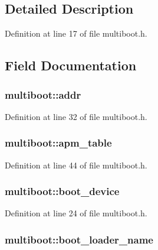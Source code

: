 \subsection{Detailed Description}


Definition at line 17 of file multiboot.h.



\subsection{Field Documentation}
\hypertarget{structmultiboot_a431baceb33f4cc5b3d503d8b8a6f007e}{
\subsubsection[{addr}]{ {\bf multiboot::addr}}}
\label{structmultiboot_a431baceb33f4cc5b3d503d8b8a6f007e}


Definition at line 32 of file multiboot.h.

\hypertarget{structmultiboot_a863760d4ec3dd65fc28eafa28e9017e6}{
\subsubsection[{apm\_\-table}]{ {\bf multiboot::apm\_\-table}}}
\label{structmultiboot_a863760d4ec3dd65fc28eafa28e9017e6}


Definition at line 44 of file multiboot.h.

\hypertarget{structmultiboot_a834a8b0e2158664622992058f9ef49bd}{
\subsubsection[{boot\_\-device}]{ {\bf multiboot::boot\_\-device}}}
\label{structmultiboot_a834a8b0e2158664622992058f9ef49bd}


Definition at line 24 of file multiboot.h.

\hypertarget{structmultiboot_a2b1df7d97141ecbc3b3d5635f77d35da}{
\subsubsection[{boot\_\-loader\_\-name}]{ {\bf multiboot::boot\_\-loader\_\-name}}}
\label{structmultiboot_a2b1df7d97141ecbc3b3d5635f77d35da}


